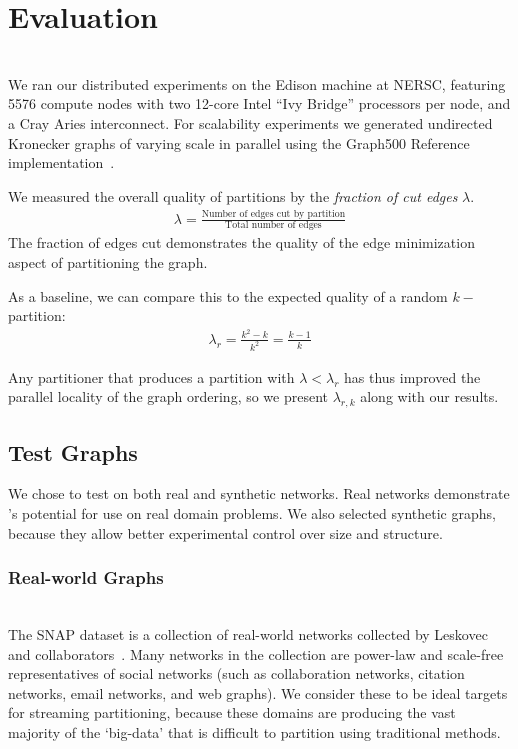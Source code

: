 \section{Evaluation}
\\

We ran our distributed experiments on the Edison machine at NERSC, featuring 5576 compute nodes with two 12-core Intel ``Ivy Bridge'' processors per node, and a Cray Aries interconnect. For scalability experiments we generated undirected Kronecker graphs of varying scale in parallel using the Graph500 Reference implementation~\cite{graph500}. 

We measured the overall quality of partitions by the \textit{fraction of cut edges} $\lambda$.
\begin{align}\lambda = \frac{\text{Number of edges cut by partition}}{\text{Total number of edges}}\end{align}
The fraction of edges cut demonstrates the quality of the edge minimization aspect of partitioning the graph.

As a baseline, we can compare this to the expected quality of a random $k-$partition:
\begin{align}\lambda_r = \frac{k^2 - k}{k^2} = \frac{k-1}{k} \end{align}

Any partitioner that produces a partition with $\lambda < \lambda_r$ has thus improved the parallel locality of the graph ordering, so we present $\lambda_{r,k}$ along with our results.

\subsection{Test Graphs}
We chose to test on both real and synthetic networks.
Real networks demonstrate \ourmethod's potential for use on real domain problems.
We also selected synthetic graphs, because they allow better experimental control over size and structure.
\subsubsection{Real-world Graphs}
\\
The SNAP dataset is a collection of real-world networks collected by Leskovec and collaborators~\cite{Leskovec-data, snapnets}. 
Many networks in the collection are power-law and scale-free representatives of social networks (such as collaboration networks, citation networks, email networks, and web graphs). We consider these to be ideal targets for streaming partitioning, because these domains are producing the vast majority of the `big-data' that is difficult to partition using traditional methods.

